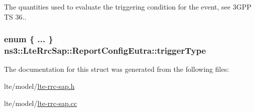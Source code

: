 The quantities used to evaluate the triggering condition for the event, see 3\+G\+PP TS 36.. 

\subsubsection[{\texorpdfstring{trigger\+Type}{triggerType}}]{\setlength{\rightskip}{0pt plus 5cm}enum \{ ... \}   ns3\+::\+Lte\+Rrc\+Sap\+::\+Report\+Config\+Eutra\+::trigger\+Type}\hypertarget{structns3_1_1LteRrcSap_1_1ReportConfigEutra_a502800e0549f5ed2fe9f0cd7b8ee3415}{}\label{structns3_1_1LteRrcSap_1_1ReportConfigEutra_a502800e0549f5ed2fe9f0cd7b8ee3415}


The documentation for this struct was generated from the following files\+:\begin{DoxyCompactItemize}
\item 
lte/model/\hyperlink{lte-rrc-sap_8h}{lte-\/rrc-\/sap.\+h}\item 
lte/model/\hyperlink{lte-rrc-sap_8cc}{lte-\/rrc-\/sap.\+cc}\end{DoxyCompactItemize}
